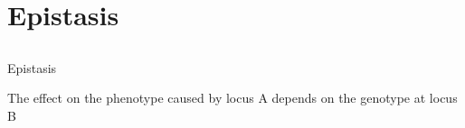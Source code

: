 \documentclass{beamer}
\begin{document}
\section{Epistasis}
\subsection{}

\begin{frame}{Epistasis}
\begin{definition}
{\color{orange} The effect on the phenotype caused by locus A depends on the genotype at locus B }
\end{definition}
\end{frame}
\end{document}
